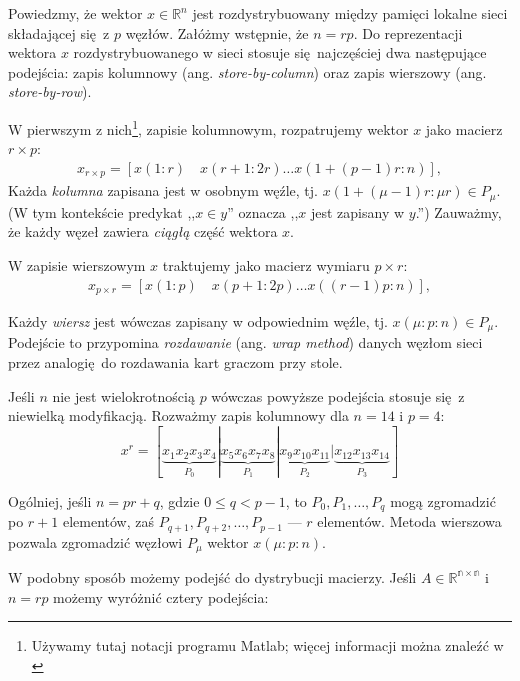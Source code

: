 Powiedzmy, że wektor \(x\in\mathbb{R}^n\) jest rozdystrybuowany między pamięci lokalne sieci składającej się z \(p\) węzłów. Załóżmy wstępnie, że \(n=rp\). Do reprezentacji wektora \(x\) rozdystrybuowanego w sieci stosuje się najczęściej dwa następujące podejścia: zapis kolumnowy (ang. \emph{store-by-column}) oraz zapis wierszowy (ang. \emph{store-by-row}).

\noindent W pierwszym z nich\footnote{Używamy tutaj notacji programu Matlab; więcej informacji można znaleźć w \cite{Matlab}}, zapisie kolumnowym, rozpatrujemy wektor \(x\) jako macierz \(r\times p\):
\begin{align*}
x_{r\times p} = \left[x(1:r)\quad x(r+1:2r) \dots x(1+(p-1)r:n)\right],
\end{align*}
\noindent Każda \emph{kolumna} zapisana jest w osobnym węźle, tj. \( x (1+(\mu-1)r\colon \mu r) \in P_{\mu}\). (W tym kontekście predykat ,,\(x\in y\)'' oznacza ,,\(x\) jest zapisany w \(y\).'') Zauważmy, że każdy węzeł zawiera \emph{ciągłą} część wektora \(x\).


W zapisie wierszowym \(x\) traktujemy jako macierz wymiaru \(p\times r\):
\begin{align*}
x_{p\times r} = \left[x(1:p)\quad x(p+1:2p) \dots x((r-1)p:n)\right],
\end{align*}

Każdy \emph{wiersz} jest wówczas zapisany w odpowiednim węźle, tj. \(x (\mu \colon p \colon n)\in P_{\mu}\). Podejście to przypomina \emph{rozdawanie} (ang. \emph{wrap method}) danych węzłom sieci przez analogię do rozdawania kart graczom przy stole.

Jeśli \(n\) nie jest wielokrotnością \(p\) wówczas powyższe podejścia stosuje się z niewielką modyfikacją. Rozważmy zapis kolumnowy dla \(n=14\) i \(p=4\):
\begin{equation}
x^r=[\underbrace{x_1 x_2 x_3 x_4}_{P_0} | \underbrace{x_5 x_6 x_7 x_8}_{P_1} | \underbrace{x_9 x_{10} x_{11}}_{P_2} | \underbrace{x_{12} x_{13} x_{14}}_{P_3}]
\end{equation} 

Ogólniej, jeśli \(n = pr + q\), gdzie \(0\leq q < p-1\), to \(P_0, P_1, \dots, P_q\) mogą zgromadzić po \(r+1\) elementów, zaś \(P_{q+1}, P_{q+2}, \dots, P_{p-1}\) --- \(r\) elementów. Metoda wierszowa pozwala zgromadzić węzłowi \(P_{\mu}\) wektor \(x(\mu\colon p \colon n)\).

W podobny sposób możemy podejść do dystrybucji macierzy. Jeśli \(A\in\mathbb{R^{n\times n}}\) i \(n = rp\) możemy wyróżnić cztery podejścia:

